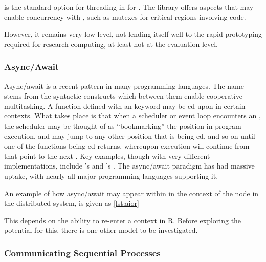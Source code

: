 \cite{nichols1996pthreads} is the standard option for threading in  for \R{}.
The library offers aspects that may enable concurrency with \R{}, such as mutexes for critical regions involving \R{} code.

However, it remains very low-level, not lending itself well to the rapid prototyping required for research computing, at least not at the \R{} evaluation level.

\subsubsection{Async/Await}

Async/await is a recent pattern in many programming languages.
The name stems from the syntactic constructs which between them enable cooperative multitasking.
A function defined with an  keyword may be ed upon in certain contexts.
What takes place is that when a scheduler or event loop encounters an , the scheduler may be thought of as ``bookmarking'' the position in program execution, and may jump to any other position that is being ed, and so on until one of the functions being ed returns, whereupon execution will continue from that point to the next .
Key examples, though with very different implementations, include 's  and 's .
The async/await paradigm has had massive uptake, with nearly all major programming languages supporting it.

An example of how async/await may appear within \R{} in the context of the node in the distributed system, is given as \cref{lst:aior}


This depends on the ability to re-enter a context in R.
Before exploring the potential for this, there is one other model to be investigated.

\subsubsection{Communicating Sequential Processes}

